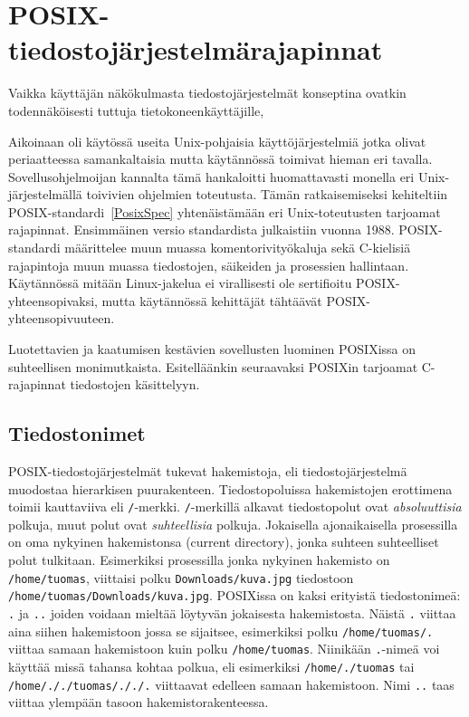 \section{POSIX-tiedostojärjestelmärajapinnat}

Vaikka käyttäjän näkökulmasta tiedostojärjestelmät konseptina ovatkin todennäköisesti tuttuja tietokoneenkäyttäjille,

Aikoinaan oli käytössä useita Unix-pohjaisia käyttöjärjestelmiä jotka olivat periaatteessa samankaltaisia mutta käytännössä toimivat hieman eri tavalla.
Sovellusohjelmoijan kannalta tämä hankaloitti huomattavasti monella eri Unix-järjestelmällä toivivien ohjelmien toteutusta.
Tämän ratkaisemiseksi kehiteltiin POSIX-standardi~\ref{PosixSpec} yhtenäistämään eri Unix-toteutusten tarjoamat rajapinnat.
Ensimmäinen versio standardista julkaistiin vuonna 1988.
POSIX-standardi määrittelee muun muassa komentorivityökaluja sekä C-kielisiä rajapintoja muun muassa tiedostojen, säikeiden ja prosessien hallintaan.
Käytännössä mitään Linux-jakelua ei virallisesti ole sertifioitu POSIX-yhteensopivaksi,
mutta käytännössä kehittäjät tähtäävät POSIX-yhteensopivuuteen.

Luotettavien ja kaatumisen kestävien sovellusten luominen POSIXissa on suhteellisen monimutkaista.
Esitelläänkin seuraavaksi POSIXin tarjoamat C-rajapinnat tiedostojen käsittelyyn.

\subsection{Tiedostonimet}
POSIX-tiedostojärjestelmät tukevat hakemistoja, eli tiedostojärjestelmä muodostaa hierarkisen puurakenteen.
Tiedostopoluissa hakemistojen erottimena toimii kauttaviiva eli \texttt{/}-merkki.
\texttt{/}-merkillä alkavat tiedostopolut ovat \emph{absoluuttisia} polkuja,
muut polut ovat \emph{suhteellisia} polkuja.
Jokaisella ajonaikaisella prosessilla on oma nykyinen hakemistonsa (current directory),
jonka suhteen suhteelliset polut tulkitaan.
Esimerkiksi prosessilla jonka nykyinen hakemisto on \texttt{/home/tuomas},
viittaisi polku \texttt{Downloads/kuva.jpg} tiedostoon \texttt{/home/tuomas/Downloads/kuva.jpg}.
POSIXissa on kaksi erityistä tiedostonimeä: \texttt{.} ja \texttt{..} joiden voidaan mieltää löytyvän jokaisesta hakemistosta.
Näistä \texttt{.} viittaa aina siihen hakemistoon jossa se sijaitsee,
esimerkiksi polku \texttt{/home/tuomas/.} viittaa samaan hakemistoon kuin polku \texttt{/home/tuomas}.
Niinikään \texttt{.}-nimeä voi käyttää missä tahansa kohtaa polkua,
eli esimerkiksi \texttt{/home/./tuomas} tai \texttt{/home/././tuomas/././.} viittaavat edelleen samaan hakemistoon.
Nimi \texttt{..} taas viittaa ylempään tasoon hakemistorakenteessa.


